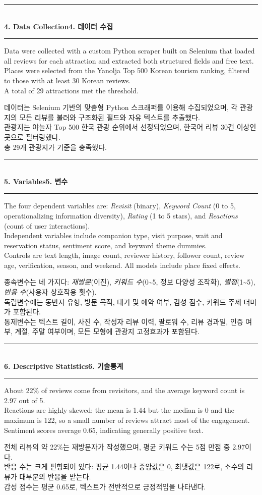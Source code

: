 \documentclass[10pt,a4paper]{article}
\newcommand{\sechead}[2]{%
  \vspace{6pt}%
  \noindent\rule{\linewidth}{0.6pt}\\[1pt]
  {\small\bfseries #1\hfill #2}\\[-3pt]
  \rule{\linewidth}{0.4pt}\par\vspace{2pt}%
}
\newcommand{\sent}[1]{#1\\[5pt]}
\newcommand{\bilingual}[2]{%
  \noindent%
  \begin{minipage}[t]{0.485\linewidth}
    \small #1
  \end{minipage}\hfill\vrule\hfill%
  \begin{minipage}[t]{0.483\linewidth}
    \small #2
  \end{minipage}\par\vspace{4pt}%
}
\begin{document}
\sechead{4. Data Collection}{4. 데이터 수집}
\bilingual{%
  \sent{Data were collected with a custom Python scraper built on Selenium that loaded all reviews for each attraction and extracted both structured fields and free text.}
  \sent{Places were selected from the Yanolja Top 500 Korean tourism ranking, filtered to those with at least 30 Korean reviews.}
  \sent{A total of 29 attractions met the threshold.}
}{%
  \sent{데이터는 Selenium 기반의 맞춤형 Python 스크래퍼를 이용해 수집되었으며, 각 관광지의 모든 리뷰를 불러와 구조화된 필드와 자유 텍스트를 추출했다.}
  \sent{관광지는 야놀자 Top 500 한국 관광 순위에서 선정되었으며, 한국어 리뷰 30건 이상인 곳으로 필터링했다.}
  \sent{총 29개 관광지가 기준을 충족했다.}
}

\sechead{5. Variables}{5. 변수}
\bilingual{%
  \sent{The four dependent variables are: \textit{Revisit} (binary), \textit{Keyword Count} (0 to 5, operationalizing information diversity), \textit{Rating} (1 to 5 stars), and \textit{Reactions} (count of user interactions).}
  \sent{Independent variables include companion type, visit purpose, wait and reservation status, sentiment score, and keyword theme dummies.}
  \sent{Controls are text length, image count, reviewer history, follower count, review age, verification, season, and weekend. All models include place fixed effects.}
}{%
  \sent{종속변수는 네 가지다: \textit{재방문}(이진), \textit{키워드 수}(0\textasciitilde5, 정보 다양성 조작화), \textit{별점}(1\textasciitilde5), \textit{반응 수}(사용자 상호작용 횟수).}
  \sent{독립변수에는 동반자 유형, 방문 목적, 대기 및 예약 여부, 감성 점수, 키워드 주제 더미가 포함된다.}
  \sent{통제변수는 텍스트 길이, 사진 수, 작성자 리뷰 이력, 팔로워 수, 리뷰 경과일, 인증 여부, 계절, 주말 여부이며, 모든 모형에 관광지 고정효과가 포함된다.}
}

\sechead{6. Descriptive Statistics}{6. 기술통계}
\bilingual{%
  \sent{About 22\% of reviews come from revisitors, and the average keyword count is 2.97 out of 5.}
  \sent{Reactions are highly skewed: the mean is 1.44 but the median is 0 and the maximum is 122, so a small number of reviews attract most of the engagement.}
  \sent{Sentiment scores average 0.65, indicating generally positive text.}
}{%
  \sent{전체 리뷰의 약 22\%는 재방문자가 작성했으며, 평균 키워드 수는 5점 만점 중 2.97이다.}
  \sent{반응 수는 크게 편향되어 있다: 평균 1.44이나 중앙값은 0, 최댓값은 122로, 소수의 리뷰가 대부분의 반응을 받는다.}
  \sent{감성 점수는 평균 0.65로, 텍스트가 전반적으로 긍정적임을 나타낸다.}
}
\end{document}
